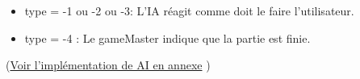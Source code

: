 \documentclass[a4paper,10pt]{article}
\begin{document}
\begin{itemize}
				\begin{itemize}
					\item type = -1 ou -2 ou -3: L'IA réagit comme doit le faire l'utilisateur.
					\item type = -4 : Le gameMaster indique que la partie est finie.
				\end{itemize}
		\end{itemize}
	(\hyperlink{AIimplementation}{Voir l'implémentation de AI en annexe} )
	
	
	
\end{document}
